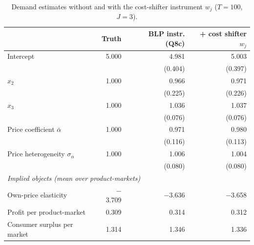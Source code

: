\begin{table}[H]
\centering\small
\caption{Demand estimates without and with the cost-shifter instrument $w_j$ ($T=100$, $J=3$).}\label{tab:q9a_estimates}
\begin{adjustbox}{max width=\linewidth}
\begin{tabular}{lrrr}
\toprule
 & Truth & BLP instr. (Q8c) & + cost shifter $w_j$ \\
\midrule
Intercept & 5.000 & 4.981 & 5.003 \\
 &  & (0.404) & (0.397) \\
$x_{2}$ & 1.000 & 0.966 & 0.971 \\
 &  & (0.225) & (0.226) \\
$x_{3}$ & 1.000 & 1.036 & 1.037 \\
 &  & (0.076) & (0.076) \\
Price coefficient $\bar\alpha$ & 1.000 & 0.971 & 0.980 \\
 &  & (0.116) & (0.113) \\
Price heterogeneity $\sigma_\alpha$ & 1.000 & 1.006 & 1.004 \\
 &  & (0.080) & (0.080) \\
\midrule
\multicolumn{4}{l}{\emph{Implied objects (mean over product-markets)}} \\
Own-price elasticity & $-$3.709 & $-$3.636 & $-$3.658 \\
Profit per product-market & 0.309 & 0.314 & 0.312 \\
Consumer surplus per market & 1.314 & 1.346 & 1.336 \\
\bottomrule
\end{tabular}
\end{adjustbox}
\par\vspace{3pt}{\footnotesize Standard errors in parentheses. Truth column for implied objects: true parameters (profit uses the true marginal cost). Model-implied profits use $(p-\hat c)s$ with $\hat c$ recovered under Bertrand pricing.}
\end{table}
